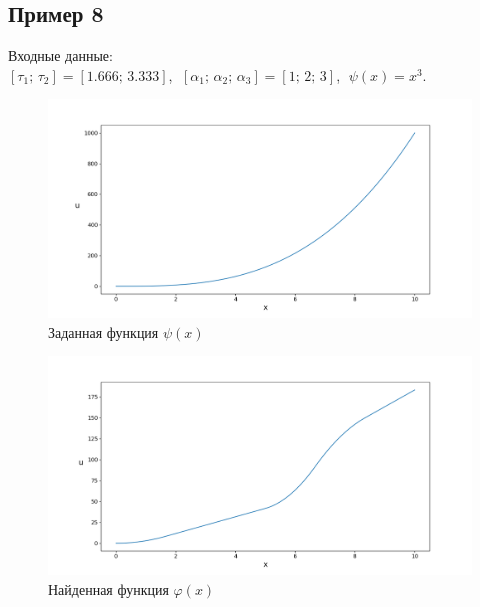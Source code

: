 \documentclass{article}
\theoremstyle{definition}
\begin{document}
\subsection{Пример 8}
Входные данные: \\
$[\tau_1;\, \tau_2] = [1.666;\, 3.333]$, 
$\;[\alpha_1;\, \alpha_2;\, \alpha_3] = [1;\, 2;\, 3]$,
$\;\psi(x) = x^3$.
\begin{figure}[H]
	\centering
	\includegraphics[trim={2.475cm, 0, 0, 1.5cm}, clip, scale=0.624]{789_psi.png}
	\caption{Заданная функция $\psi(x)$}
	\label{fig:image15}
\end{figure}

\begin{figure}[H]
	\centering
	\includegraphics[trim={2.175cm, 0, 0, 1.5cm}, clip, scale=0.618]{7_u0.png}
	\caption{Найденная функция $\varphi(x)$}
	\label{fig:image16}
\end{figure}

\newpage
\end{document}
